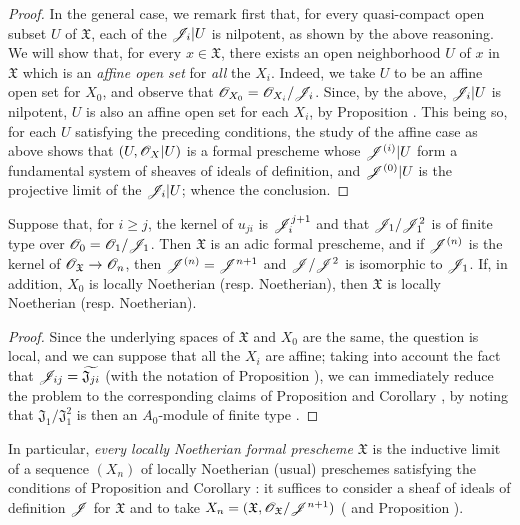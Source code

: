 \begin{proof}
In the general case, we remark first that, for every quasi-compact open subset $U$ of $\mathfrak{X}$, each of the $\mathscr{J}_i|U$ is nilpotent, as shown by the above reasoning.
We will show that, for every $x\in\mathfrak{X}$, there exists an open neighborhood $U$ of $x$ in $\mathfrak{X}$ which is an \emph{affine open set} for \emph{all} the $X_i$.
Indeed, we take $U$ to be an affine open set for $X_0$, and observe that $\mathscr{O}_{X_0}=\mathscr{O}_{X_i}/\mathscr{J}_i$.
Since, by the above, $\mathscr{J}_i|U$ is nilpotent, $U$ is also an affine open set for each $X_i$, by Proposition .
This being so, for each $U$ satisfying the preceding conditions, the study of the affine case as above shows that $(U,\mathscr{O}_X|U)$ is a formal prescheme whose $\mathscr{J}^{(i)}|U$ form a fundamental system of sheaves of ideals of definition, and $\mathscr{J}^{(0)}|U$ is the projective limit of the $\mathscr{J}_i|U$; whence the conclusion.
\end{proof}

\begin{corollary}[10.6.4]
\label{I.10.6.4}
Suppose that, for $i\geq j$, the kernel of $u_{ji}$ is $\mathscr{J}_i^{j+1}$ and that $\mathscr{J}_1/\mathscr{J}_1^2$
is of finite type over $\mathscr{O}_0=\mathscr{O}_1/\mathscr{J}_1$.
Then $\mathfrak{X}$ is an adic formal prescheme, and if $\mathscr{J}^{(n)}$ is the kernel of $\sh{O}_\mathfrak{X}\to\sh{O}_n$, then $\mathscr{J}^{(n)}=\mathscr{J}^{n+1}$ and $\mathscr{J}/\mathscr{J}^2$ is isomorphic to $\mathscr{J}_1$.
If, in addition, $X_0$ is locally Noetherian (resp. Noetherian), then $\mathfrak{X}$ is locally Noetherian (resp. Noetherian).
\end{corollary}

\begin{proof}
Since the underlying spaces of $\mathfrak{X}$ and $X_0$ are the same, the question is local, and we can suppose that all the $X_i$ are affine; taking into account the fact that $\mathscr{J}_{ij}=\widetilde{\mathfrak{J}_{ji}}$ (with the notation of Proposition ), we can immediately reduce the problem to the corresponding claims of Proposition  and Corollary , by noting that $\mathfrak{J}_1/\mathfrak{J}_1^2$ is then an $A_0$-module of finite type .
\end{proof}

In particular, \emph{every locally Noetherian formal prescheme $\mathfrak{X}$} is the inductive limit of a sequence $(X_n)$ of locally Noetherian (usual) preschemes satisfying the conditions of Proposition  and Corollary : it suffices to consider a sheaf of ideals of definition $\mathscr{J}$ for $\mathfrak{X}$  and to take $X_n=(\mathfrak{X},\mathscr{O}_\mathfrak{X}/\mathscr{J}^{n+1})$ ( and Proposition ).

